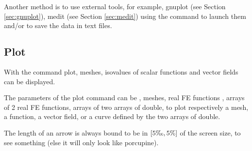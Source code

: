 \documentclass[a4paper,twoside,12pt]{book}
\begin{document}
Another method is to use external tools, for example, gnuplot
(see Section \ref{sec:gnuplot}), medit (see Section \ref{sec:medit})
 using the command  to launch them and/or to save the data in text files.

\subsection{Plot} \label{sec:Plot}
   With the command plot, meshes, isovalues of scalar functions and vector fields can be displayed.

The parameters of the plot command can be , meshes, real FE functions ,
arrays of 2  real FE functions, arrays of two arrays of double, to plot
respectively a mesh, a function, a vector field, or a curve defined by the two arrays of double.
\begin{note}
The length of an arrow is always  bound to be in  $[5\tcperthousand, 5\%]$ of the screen size, to see something (else it will only look like porcupine). %
\end{note}
\end{document}
